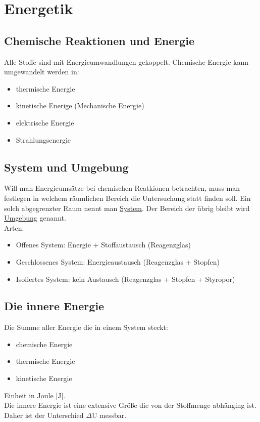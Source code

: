 
\section{Energetik} \label{sec:energetik}


\subsection{Chemische Reaktionen und Energie}
Alle Stoffe sind mit Energieumwandlungen gekoppelt.
Chemische Energie kann umgewandelt werden in:
\begin{multicols}{2}
    \begin{itemize}
        \item thermische Energie
        \item kinetische Enerige (Mechanische Energie)
        \item elektrische Energie
        \item Strahlungsenergie
    \end{itemize}
\end{multicols}


\subsection{System und Umgebung}
Will man Energieumsätze bei chemischen Reatkionen betrachten, muss man festlegen in welchem räumlichen Bereich die Untersuchung statt finden soll.
Ein solch abgegrenzter Raum nennt man \underline{System}. Der Bereich der übrig bleibt wird \underline{Umgebung} genannt. \\
Arten:
\begin{itemize}
    \item Offenes System: 
        Energie + Stoffaustausch (Reagenzglas)
    \item Geschlossenes System:
        Energieaustausch (Reagenzglas + Stopfen)
    \item Isoliertes System: 
        kein Austausch  (Reagenzglas + Stopfen + Styropor)
\end{itemize}


\subsection{Die innere Energie}
Die Summe aller Energie die in einem System steckt:
\begin{multicols}{3}
    \begin{itemize}
        \item chemische Energie
        \item thermische Energie
        \item kinetische Energie
    \end{itemize}
\end{multicols}
Einheit in Joule [J].\\
Die innere Energie ist eine extensive Größe die von der Stoffmenge abhänging ist. Daher ist der Unterschied $\Delta$U messbar.



